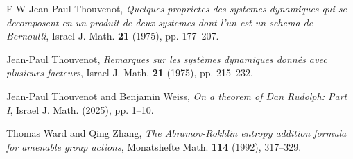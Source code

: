 \documentclass{amsart}
\theoremstyle{remark}
\begin{document}
\begin{thebibliography}{F-W}
Jean-Paul Thouvenot, \emph{Quelques proprietes des systemes dynamiques qui se decomposent en un produit de deux systemes dont l’un est un schema de Bernoulli}, Israel J. Math. {\bf 21} (1975), pp. 177--207.

Jean-Paul Thouvenot, \emph{Remarques sur les systèmes dynamiques donn\'es avec plusieurs facteurs}, Israel J. Math.
{\bf 21} (1975), pp. 215--232.

Jean-Paul Thouvenot and Benjamin Weiss, \emph{On a theorem of Dan Rudolph: Part I}, Israel J. Math. (2025), pp. 1--10.

Thomas Ward and Qing Zhang, \emph{The Abramov-Rokhlin entropy addition formula for amenable group actions}, Monatshefte Math. {\bf 114} (1992), 317--329.

\end{thebibliography}
\end{document}
